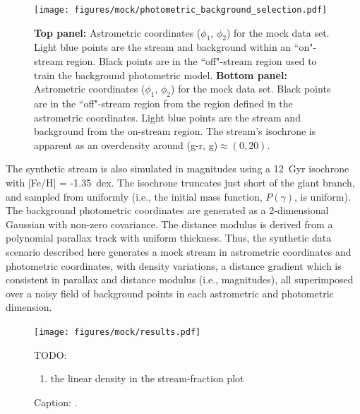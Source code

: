 \documentclass[twocolumn]{aastex631}
\begin{document}
        \begin{figure}
            \centering
            \texttt{[image: figures/mock/photometric\_background\_selection.pdf]}
            \caption{
                \textbf{Top panel:} Astrometric coordinates ($\phi_1$, $\phi_2$) for the mock data set.
                Light blue points are the stream and background within an ``on"-stream region. Black points are in the ``off"-stream region used to train the background photometric model.
                \textbf{Bottom panel:} Astrometric coordinates ($\phi_1$, $\phi_2$) for the mock data set.
                Black points are in the ``off"-stream region from the region defined in the astrometric coordinates.
                Light blue points are the stream and background from the on-stream region. The stream's isochrone is apparent as an overdensity around (g-r, g)$\approx (0, 20)$.
            }
            \label{fig:mock_data_photometric_background_selection}
        \end{figure}
    
        The synthetic stream is also simulated in magnitudes using a 12~Gyr isochrone with [Fe/H] = -1.35~dex. The isochrone truncates just short of the giant branch, and sampled from uniformly (i.e., the initial mass function, $P(\gamma)$, is uniform). The background photometric coordinates are generated as a 2-dimensional Gaussian with non-zero covariance. The distance modulus is derived from a polynomial parallax track with uniform thickness. Thus, the synthetic data scenario described here generates a mock stream in astrometric coordinates and photometric coordinates, with density variations, a distance gradient which is consistent in parallax and distance modulus (i.e., magnitudes), all superimposed over a noisy field of background points in each astrometric and photometric dimension.

        \begin{figure}
            \centering
            \texttt{[image: figures/mock/results.pdf]}
            \caption{Caption: .}
            TODO:
            \begin{enumerate}
                \item the linear density in the stream-fraction plot
            \end{enumerate}
            \label{fig:mock_data_result}
        \end{figure}
\end{document}
